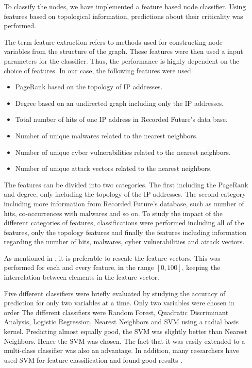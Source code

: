 To classify the nodes, we have implemented a feature based node classifier. Using features based on topological information, predictions about their criticality was performed.

The term feature extraction refers to methods used for constructing node variables from the structure of the graph. These features were then used a input parameters for the classifier. Thus, the performance is highly dependent on the choice of features. In our case, the following features were used
\begin{itemize}
    \item PageRank based on the topology of IP addresses.
    \item Degree based on an undirected graph including only the IP addresses.
    \item Total number of hits of one IP address in Recorded Future's data base.
    \item Number of unique malwares related to the nearest neighbors.
    \item Number of unique cyber vulnerabilities related to the nearest neighbors.
    \item Number of unique attack vectors related to the nearest neighbors.
\end{itemize}

The features can be divided into two categories. The first including the PageRank and degree, only including the topology of the IP addresses. The second category including more information from Recorded Future's database, such as number of hits, co-occurrences with malwares and so on. To study the impact of the different categories of features, classifications were performed including all of the features, only the topology features and finally the features including information regarding the number of hits, malwares, cyber vulnerabilities and attack vectors.

As mentioned in , it is preferable to rescale the feature vectors. This was performed for each and every feature, in the range $[0,100]$, keeping the interrelation between elements in the feature vector. 

Five different classifiers were briefly evaluated by studying the accuracy of prediction for only two variables at a time. Only two variables were chosen in order The different classifiers were Random Forest, Quadratic Discriminant Analysis, Logistic Regression, Nearest Neighbors and SVM using a radial basis kernel. Predicting almost equally good, the SVM was slightly better than Nearest Neighbors. Hence the SVM was chosen. The fact that it was easily extended to a multi-class classifier was also an advantage. In addition, many researchers have used SVM for feature classification and found good results \citep{campbell2011}. 

